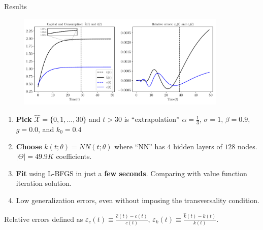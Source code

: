 \documentclass[aspectratio=169,10pt]{beamer}
\newcommand{\emphcolor}[1]{\textbf{\textcolor{emphcolorval}{#1}}}
\newcommand{\Xtrain}{\hat{\mathcal{X}}}
\begin{document}
\begin{frame}[label = res_seq_ncg]{Results}
	
	\begin{figure}[htb]
		\centering
		\includegraphics[width=10cm]{./figures/growth_seq_g0_one_run.pdf}
	\end{figure}
	
	\begin{enumerate}
		\item \emphcolor{Pick} $\Xtrain =\{0,1,...,30\}$ and $t > 30$ is ``extrapolation''  $\alpha=\frac{1}{3}$, $\sigma =1$, $\beta = 0.9$, $g = 0.0$, and $k_0 = 0.4$
		\item \emphcolor{Choose} $k(t;\theta) = NN(t;\theta)$ where ``NN'' has $4$ hidden layers of $128$ nodes. $|\Theta| = 49.9 K$ coefficients.
		\item \emphcolor{Fit} using L-BFGS in just a \emphcolor{few seconds}. Comparing with value function iteration solution.
		\item Low generalization errors, even without imposing the transversality condition. 
	\end{enumerate}
	Relative errors defined as $\varepsilon_c(t)\equiv \frac{\hat{c}(t)-c(t)}{c(t)}$, $\varepsilon_k(t)\equiv \frac{\hat{k}(t)-k(t)}{k(t)}$.
\end{frame}
\end{document}
